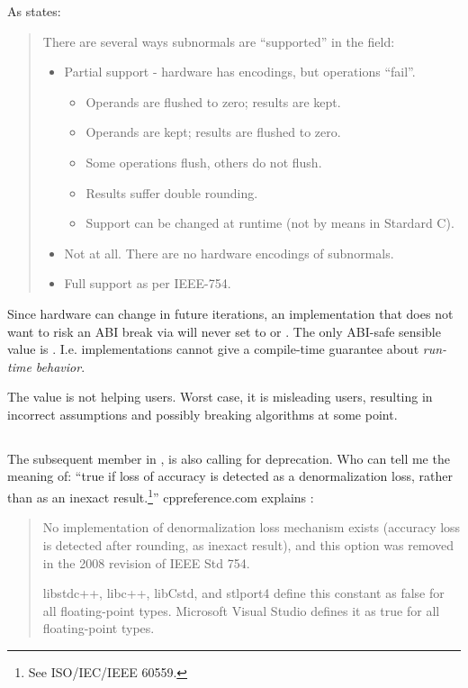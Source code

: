As \textcite{WG14N2993} states:
\begin{quote}{}
There are several ways subnormals are “supported” in the field:

\begin{itemize}
  \item Partial support - hardware has encodings, but operations “fail”.
  \begin{itemize}
    \item Operands are flushed to zero; results are kept.
    \item Operands are kept; results are flushed to zero.
    \item Some operations flush, others do not flush.
    \item Results suffer double rounding.
    \item Support can be changed at runtime (not by means in Stardard C).
  \end{itemize}
  \item Not at all. There are no hardware encodings of subnormals.
  \item Full support as per IEEE-754.
\end{itemize}
\end{quote}

Since hardware can change in future iterations, an implementation that does not want to 
risk an ABI break via  will never set  to 
 or . The only ABI-safe sensible value is 
. I.e. implementations cannot give a compile-time guarantee 
about \emph{run-time behavior}.

The  value is not helping \CC{} users. Worst case, it is misleading 
users, resulting in incorrect assumptions and possibly breaking algorithms at some point.

\subsection{}

The subsequent member in ,  is also calling for 
deprecation. Who can tell me the meaning of: “true if loss of accuracy is detected as a 
denormalization loss, rather than as an inexact result.\footnote{See ISO/IEC/IEEE 60559.}” 
cppreference.com explains \cite{has.denorm.loss.cppreference}:
\begin{quote}{}
  No implementation of denormalization loss mechanism exists (accuracy loss is detected 
  after rounding, as inexact result), and this option was removed in the 2008 revision of 
  IEEE Std 754.

  libstdc++, libc++, libCstd, and stlport4 define this constant as false for all 
  floating-point types. Microsoft Visual Studio defines it as true for all floating-point 
  types.
\end{quote}

